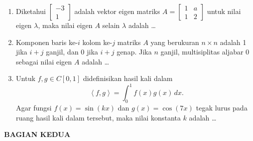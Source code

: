 \documentclass[12pt,twoside]{article}
\begin{document}
\begin{enumerate}
	\item Diketahui $\left[ \begin{array}{c}
				      -3 \\1
			      \end{array} \right]$ adalah vektor eigen matriks $A = \left[ \begin{array}{cc}
				      1 & a \\1&2
			      \end{array} \right]$ untuk nilai eigen $\lambda$, maka nilai eigen $A$ selain $\lambda$ adalah \dots

	\item Komponen baris ke-$i$ kolom ke-$j$ matriks $A$ yang berukuran $n \times n$ adalah 1 jika $i+j$ ganjil, dan 0 jika $i+j$ genap. Jika $n$ ganjil, multisiplitas aljabar 0 sebagai nilai eigen $A$ adalah \dots

	\item Untuk $f,g \in C[0,1]$ didefinisikan hasil kali dalam
	      \begin{equation*}
		      \left< f,g \right> = \displaystyle\int_{0}^{1} f(x)g(x)\,dx.
	      \end{equation*}
	      Agar fungsi $f(x)= \sin(kx) $ dan $g(x)= \cos(7x)$ tegak lurus pada ruang hasil kali dalam tersebut, maka nilai konstanta $k$ adalah \dots
\end{enumerate}
\newpage \textbf{BAGIAN KEDUA}
\end{document}
